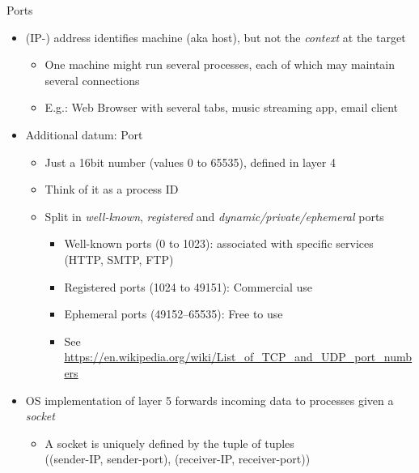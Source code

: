 
\begin{frame}{Ports}
%
\begin{itemize}
\item (IP-) address identifies machine (aka host), but not the \emph{context} at the target
	\begin{itemize}
	\item One machine might run several processes, each of which may maintain several connections
	\item E.\;g.: Web Browser with several tabs, music streaming app, email client
	\end{itemize}
\pause
\item[\Thus] Additional datum: Port
	\begin{itemize}
	\item Just a 16bit number (values 0 to 65535), defined in layer 4
	\item Think of it as a process ID
	\item Split in \emph{well-known}, \emph{registered} and \emph{dynamic/private/ephemeral} ports
		\begin{itemize}
		\item Well-known ports (0 to 1023): associated with specific services (\zB HTTP, SMTP, FTP)
		\item Registered ports (1024 to 49151): Commercial use
		\item Ephemeral ports (49152–65535): Free to use
		\item See \url{https://en.wikipedia.org/wiki/List_of_TCP_and_UDP_port_numbers}
		\end{itemize}
	\end{itemize}
\pause
\item OS implementation of layer 5 forwards incoming data to processes given a \emph{socket}
	\begin{itemize}
	\item A socket is uniquely defined by the tuple of tuples\\
		((sender-IP, sender-port), (receiver-IP, receiver-port))
	\end{itemize}
\end{itemize}
%
\end{frame}


